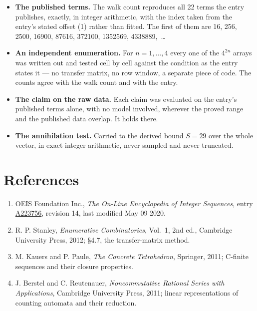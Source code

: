 \documentclass[11pt]{article}
\theoremstyle{definition}
\begin{document}
\begin{itemize}

\item {\bfseries The published terms.} The walk count reproduces all 22 terms the entry publishes, exactly, in integer arithmetic, with the index taken from the entry's stated offset (1) rather than fitted. The first of them are 16, 256, 2500, 16900, 87616, 372100, 1352569, 4338889,~\dots

\item {\bfseries An independent enumeration.} For $n = 1,\dots,4$ every one of the $4^{2n}$ arrays was written out and tested cell by cell against the condition as the entry states it --- no transfer matrix, no row window, a separate piece of code. The counts agree with the walk count and with the entry.

\item {\bfseries The claim on the raw data.} Each claim was evaluated on the entry's published terms alone, with no model involved, wherever the proved range and the published data overlap. It holds there.

\item {\bfseries The annihilation test.} Carried to the derived bound $S = 29$ over the whole vector, in exact integer arithmetic, never sampled and never truncated.

\end{itemize}

\section{References}

\begin{enumerate}

\item OEIS Foundation Inc., \emph{The On-Line Encyclopedia of Integer Sequences}, entry \href{https://oeis.org/A223756}{A223756}, revision 14, last modified May 09 2020.

\item R. P. Stanley, \emph{Enumerative Combinatorics}, Vol.~1, 2nd ed., Cambridge University Press, 2012; \S4.7, the transfer-matrix method.

\item M. Kauers and P. Paule, \emph{The Concrete Tetrahedron}, Springer, 2011; C-finite sequences and their closure properties.

\item J. Berstel and C. Reutenauer, \emph{Noncommutative Rational Series with Applications}, Cambridge University Press, 2011; linear representations of counting automata and their reduction.

\end{enumerate}
\end{document}
